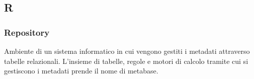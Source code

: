 \subsection{R}

\subsubsection{Repository}
Ambiente di un sistema informatico in cui vengono gestiti i metadati attraverso tabelle relazionali. L'insieme di tabelle, regole e motori di calcolo tramite cui si gestiscono i metadati prende il nome di metabase.